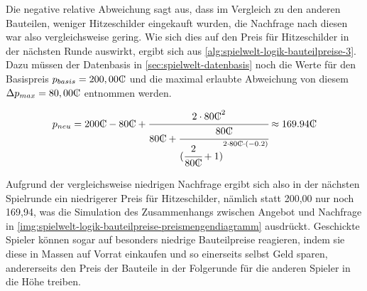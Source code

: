 Die negative relative Abweichung sagt aus, dass im Vergleich zu den anderen Bauteilen, weniger Hitzeschilder eingekauft wurden, die Nachfrage nach diesen war also vergleichsweise gering. Wie sich dies auf den Preis für Hitzeschilder in der nächsten Runde auswirkt, ergibt sich aus \ref{alg:spielwelt-logik-bauteilpreise-3}. Dazu müssen der Datenbasis in \ref{sec:spielwelt-datenbasis} noch die Werte für den Basispreis $p_{basis} = 200,00\tc$ und die maximal erlaubte Abweichung von diesem $\Delta{}p_{max} = 80,00\tc$ entnommen werden.

\begin{large}
\begin{equation}
     p_{neu} = 200 \tc -80 \tc + \cfrac{2 \cdot 80 \tc^2}{80 \tc + \cfrac{80 \tc}{({\cfrac{2}{80 \tc} + 1)}^{2 \cdot 80 \tc \cdot (-0.2)}}} \approx 169.94 \tc \nonumber
\end{equation}
\end{large}

Aufgrund der vergleichsweise niedrigen Nachfrage ergibt sich also in der nächsten Spielrunde ein niedrigerer Preis für Hitzeschilder, nämlich statt 200,00\curr{} nur noch 169,94\curr{}, was die Simulation des Zusammenhangs zwischen Angebot und Nachfrage in \ref{img:spielwelt-logik-bauteilpreise-preismengendiagramm} ausdrückt. Geschickte Spieler können sogar auf besonders niedrige Bauteilpreise reagieren, indem sie diese in Massen auf Vorrat einkaufen und so einerseits selbst Geld sparen, andererseits den Preis der Bauteile in der Folgerunde für die anderen Spieler in die Höhe treiben.
